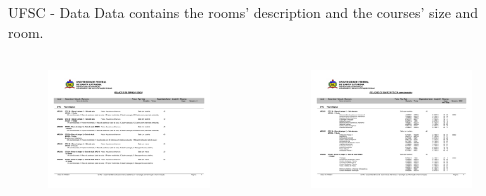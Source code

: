 \documentclass{beamer}
\begin{document}
\begin{frame}{UFSC - Data}
    Data contains the rooms' description and the courses' size and room.

  \begin{columns}[c]
    \begin{column}{.5\textwidth}

	\begin{figure}[h]
	    \centering
	    \colorbox{white}{\includegraphics[width=\textwidth]{example-df-rooms.pdf}}
	\end{figure}

    \end{column}
    \begin{column}{.5\textwidth}

	\begin{figure}[h]
	    \centering
	    \colorbox{white}{\includegraphics[width=\textwidth]{example-df-classes.pdf}}
	\end{figure}

    \end{column}
  \end{columns}
    
\end{frame}
\end{document}
